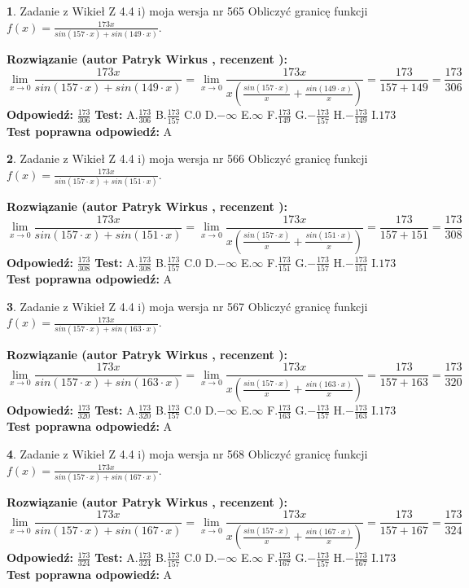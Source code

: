 \documentclass[12pt, a4paper]{article}
\theoremstyle{definition} %
\newtheorem{zad}{}
\newcommand{\zadStart}[1]{\begin{zad}#1\newline}
\newcommand{\zadStop}{\end{zad}}
\newcommand{\rozwStart}[2]{\noindent \textbf{Rozwiązanie (autor #1 , recenzent #2): }\newline}
\newcommand{\rozwStop}{\newline}
\newcommand{\odpStart}{\noindent \textbf{Odpowiedź:}\newline}
\newcommand{\odpStop}{\newline}
\newcommand{\testStart}{\noindent \textbf{Test:}\newline}
\newcommand{\testStop}{\newline}
\newcommand{\kluczStart}{\noindent \textbf{Test poprawna odpowiedź:}\newline}
\newcommand{\kluczStop}{\newline}
\begin{document}
\zadStart{Zadanie z Wikieł Z 4.4 i) moja wersja nr 565}
Obliczyć granicę funkcji $f(x)=\frac{173x}{sin(157\cdot x) +sin(149\cdot x)}$.
\zadStop
\rozwStart{Patryk Wirkus}{}
$$\lim\limits_{x\to 0}\frac{173x}{sin(157\cdot x) +sin(149\cdot x)}=\lim\limits_{x\to 0}\frac{173x}{x(\frac{sin(157\cdot x)}{x}+\frac{sin(149\cdot x)}{x})}=\frac{173}{157+149} = \frac{173}{306}$$
\rozwStop
\odpStart
$\frac{173}{306}$
\odpStop
\testStart
A.$\frac{173}{306}$
B.$\frac{173}{157}$
C.$0$
D.$-\infty$
E.$\infty$
F.$\frac{173}{149}$
G.$-\frac{173}{157}$
H.$-\frac{173}{149}$
I.$173$
\testStop
\kluczStart
A
\kluczStop



\zadStart{Zadanie z Wikieł Z 4.4 i) moja wersja nr 566}
Obliczyć granicę funkcji $f(x)=\frac{173x}{sin(157\cdot x) +sin(151\cdot x)}$.
\zadStop
\rozwStart{Patryk Wirkus}{}
$$\lim\limits_{x\to 0}\frac{173x}{sin(157\cdot x) +sin(151\cdot x)}=\lim\limits_{x\to 0}\frac{173x}{x(\frac{sin(157\cdot x)}{x}+\frac{sin(151\cdot x)}{x})}=\frac{173}{157+151} = \frac{173}{308}$$
\rozwStop
\odpStart
$\frac{173}{308}$
\odpStop
\testStart
A.$\frac{173}{308}$
B.$\frac{173}{157}$
C.$0$
D.$-\infty$
E.$\infty$
F.$\frac{173}{151}$
G.$-\frac{173}{157}$
H.$-\frac{173}{151}$
I.$173$
\testStop
\kluczStart
A
\kluczStop



\zadStart{Zadanie z Wikieł Z 4.4 i) moja wersja nr 567}
Obliczyć granicę funkcji $f(x)=\frac{173x}{sin(157\cdot x) +sin(163\cdot x)}$.
\zadStop
\rozwStart{Patryk Wirkus}{}
$$\lim\limits_{x\to 0}\frac{173x}{sin(157\cdot x) +sin(163\cdot x)}=\lim\limits_{x\to 0}\frac{173x}{x(\frac{sin(157\cdot x)}{x}+\frac{sin(163\cdot x)}{x})}=\frac{173}{157+163} = \frac{173}{320}$$
\rozwStop
\odpStart
$\frac{173}{320}$
\odpStop
\testStart
A.$\frac{173}{320}$
B.$\frac{173}{157}$
C.$0$
D.$-\infty$
E.$\infty$
F.$\frac{173}{163}$
G.$-\frac{173}{157}$
H.$-\frac{173}{163}$
I.$173$
\testStop
\kluczStart
A
\kluczStop



\zadStart{Zadanie z Wikieł Z 4.4 i) moja wersja nr 568}
Obliczyć granicę funkcji $f(x)=\frac{173x}{sin(157\cdot x) +sin(167\cdot x)}$.
\zadStop
\rozwStart{Patryk Wirkus}{}
$$\lim\limits_{x\to 0}\frac{173x}{sin(157\cdot x) +sin(167\cdot x)}=\lim\limits_{x\to 0}\frac{173x}{x(\frac{sin(157\cdot x)}{x}+\frac{sin(167\cdot x)}{x})}=\frac{173}{157+167} = \frac{173}{324}$$
\rozwStop
\odpStart
$\frac{173}{324}$
\odpStop
\testStart
A.$\frac{173}{324}$
B.$\frac{173}{157}$
C.$0$
D.$-\infty$
E.$\infty$
F.$\frac{173}{167}$
G.$-\frac{173}{157}$
H.$-\frac{173}{167}$
I.$173$
\testStop
\kluczStart
A
\kluczStop
\end{document}
